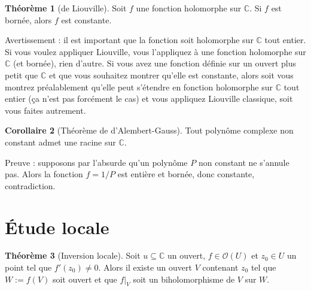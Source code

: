 \documentclass[11pt,a4paper]{book}
\newcommand{\C}{\mathbb{C}}
\theoremstyle{definition}
\newtheorem{theoreme}{Th\'eor\`eme}[section]
\newtheorem{corollaire}[theoreme]{Corollaire}
\theoremstyle{plain}
\begin{document}
 \begin{theoreme}[de Liouville]
 Soit $f$ une fonction holomorphe sur $\C$.
 Si $f$ est bornée, alors $f$ est constante.
 \end{theoreme}
 
 Avertissement : il est important que la fonction soit holomorphe sur $\C$ tout entier. 
 Si vous voulez appliquer Liouville, vous l'appliquez à une fonction holomorphe sur $\C$ (et bornée), rien d'autre.  
Si vous avez une fonction définie sur un ouvert plus petit que $\C$ et que vous souhaitez montrer qu'elle est constante, alors soit vous montrez préalablement qu'elle peut s'étendre en fonction holomorphe sur $\C$ tout entier (ça n'est pas forcément le cas) et vous appliquez Liouville classique, soit vous faites autrement.



 
\begin{corollaire}[Théorème de d'Alembert-Gauss]
Tout polynôme complexe non constant admet une racine sur $\C$.
\end{corollaire} 

Preuve : supposons par l'absurde qu'un polynôme $P$ non constant ne s'annule pas. Alors la fonction $f=1/P$ est entière et bornée, donc constante, contradiction.
 



\section{Étude locale}

\begin{theoreme}[Inversion locale]
Soit $u\subseteq \C$ un ouvert, $f\in \mathcal O(U)$ et $z_0\in U$ un point tel que $f'(z_0)\neq 0$.
Alors il existe un ouvert $V$ contenant $z_0$ tel que $W:=f(V)$ soit ouvert et que $f|_V$ soit un biholomorphisme de $V$ sur $W$.
\end{theoreme}

\end{document}
